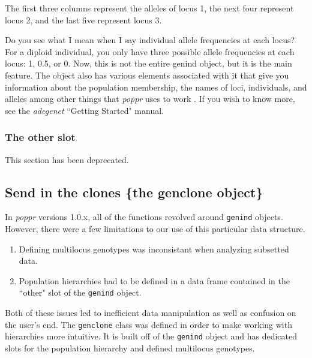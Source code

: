 \documentclass[letterpaper]{article}\usepackage[]{graphicx}\usepackage[]{color}
\begin{document}
The first three columns represent the alleles of locus 1, the next four represent locus 2, and the last five represent locus 3.

Do you see what I mean when I say individual allele frequencies at each locus? For a diploid individual, you only have three possible allele frequencies at each locus: 1, 0.5, or 0. Now, this is not the entire genind object, but it is the main feature. The object also has various elements associated with it that give you information about the population membership, the names of loci, individuals, and alleles among other things that \textit{poppr} uses to work \cite{Jombart:2008}. If you wish to know more, see the \textit{adegenet} ``Getting Started" manual. 

\subsubsection{The other slot}\label{intro:genind:other}

This section has been deprecated.

\subsection{Send in the clones \{the genclone object\}}\label{intro:genclone}

In \textit{poppr} versions 1.0.x, all of the functions revolved around
\texttt{genind} objects. However, there were a few limitations to our use of
this particular data structure.

\begin{enumerate}
  \item Defining multilocus genotypes was inconsistant when analyzing subsetted
        data.
  \item Population hierarchies had to be defined in a data frame contained in 
        the ``other" slot of the \texttt{genind} object. 
\end{enumerate}

Both of these issues led to inefficient data manipulation as well as confusion 
on the user's end. The \texttt{genclone} class was defined in order to make 
working with hierarchies more intuitive. It is built off of the 
\texttt{genind} object and has dedicated slots for the population hierarchy and
defined multilocus genotypes. 
\end{document}
